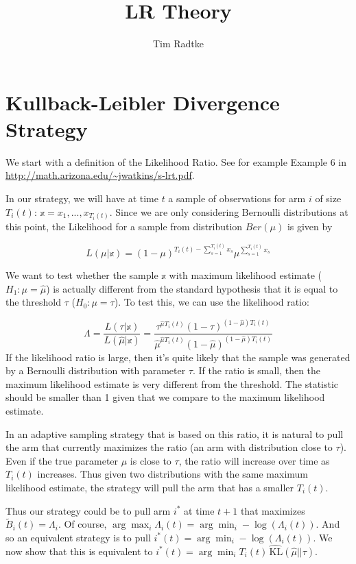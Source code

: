 \documentclass[12pt,]{article}
\title{LR Theory}
\author{Tim Radtke}
\date{}
\newcommand{\KL}{\,\text{KL}}
\begin{document}
\maketitle

\section{Kullback-Leibler Divergence
Strategy}\label{kullback-leibler-divergence-strategy}

We start with a definition of the Likelihood Ratio. See for example
Example 6 in \url{http://math.arizona.edu/~jwatkins/s-lrt.pdf}.

In our strategy, we will have at time \(t\) a sample of observations for
arm \(i\) of size \(T_i(t)\): \(\mathbb{x} = x_1, ..., x_{T_i(t)}\).
Since we are only considering Bernoulli distributions at this point, the
Likelihood for a sample from distribution \(Ber(\mu)\) is given by

\[ 
L(\mu|\mathbb{x}) = (1-\mu)^{T_i(t) - \sum_{s = 1}^{T_i(t)} x_s} \mu^{\sum_{s = 1}^{T_i(t)} x_s}
\]

We want to test whether the sample \(\mathbb{x}\) with maximum
likelihood estimate (\(H_1: \mu = \hat{\mu}\)) is actually different
from the standard hypothesis that it is equal to the threshold \(\tau\)
(\(H_0: \mu = \tau\)). To test this, we can use the likelihood ratio:

\[
\Lambda = \frac{L(\tau|\mathbb{x})}{L(\hat{\mu}|\mathbb{x})} = \frac{\tau^{\hat{\mu}T_i(t)}(1-\tau)^{(1-\hat{\mu})T_i(t)} }{\hat{\mu}^{\hat{\mu}T_i(t)}(1-\hat{\mu})^{(1-\hat{\mu})T_i(t)}}
\] If the likelihood ratio is large, then it's quite likely that the
sample was generated by a Bernoulli distribution with parameter
\(\tau\). If the ratio is small, then the maximum likelihood estimate is
very different from the threshold. The statistic should be smaller than
1 given that we compare to the maximum likelihood estimate.

In an adaptive sampling strategy that is based on this ratio, it is
natural to pull the arm that currently maximizes the ratio (an arm with
distribution close to \(\tau\)). Even if the true parameter \(\mu\) is
close to \(\tau\), the ratio will increase over time as \(T_i(t)\)
increases. Thus given two distributions with the same maximum likelihood
estimate, the strategy will pull the arm that has a smaller \(T_i(t)\).

Thus our strategy could be to pull arm \(i^*\) at time \(t+1\) that
maximizes \(\tilde{B}_i(t) = \Lambda_i\). Of course,
\(\arg \max_i \Lambda_i(t) = \arg \min_i -\log(\Lambda_i(t))\). And so
an equivalent strategy is to pull
\(i^*(t) = \arg \min_i -\log(\Lambda_i(t))\). We now show that this is
equivalent to \(i^*(t) = \arg \min_i T_i(t)\hat{\KL}(\hat{\mu}||\tau)\).
\end{document}
